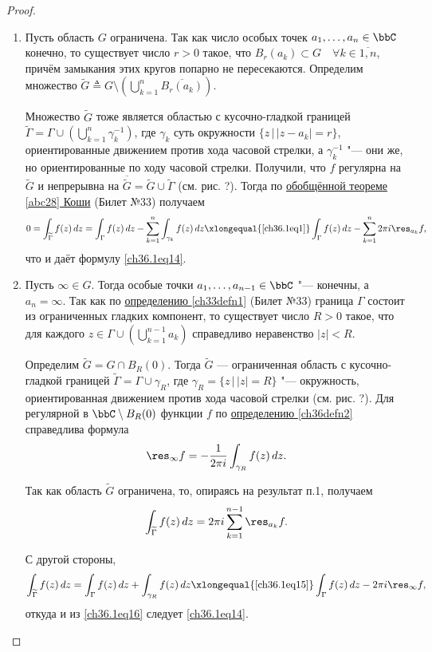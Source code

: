 \begin{proof}\leavevmode
\begin{enumerate}[wide, labelwidth=!, labelindent=0pt]
\item Пусть область $G$ ограничена. Так как число особых точек $a_1,\ldots,a_n \in \bbC$ конечно, то существует число $r > 0$ такое, что $B_r(a_k) \subset G \quad \forall k \in \overline{1,n}$, причём замыкания этих кругов попарно не пересекаются. Определим множество $\widetilde{G} \triangleq G \setminus \left( \bigcup\limits_{k = 1}^{n} \overline{B_r(a_k)}\right)$.

Множество $\widetilde{G}$ тоже является областью с кусочно-гладкой границей $\widetilde{\Gamma} = \Gamma \cup \left( \bigcup\limits_{k = 1}^{n} \gamma_{k}^{-1} \right)$,	где $\gamma_k$ суть окружности $\{ z \,\big|\, |z - a_k| = r \}$, ориентированные движением против хода часовой стрелки, а $\gamma_{k}^{-1}$ "--- они же, но ориентированные по ходу часовой стрелки. Получили, что $f$ регулярна на $\widetilde{G}$ и непрерывна на $\overline{\widetilde{G}} = \widetilde{G} \cup \widetilde{\Gamma}$ (см. рис. ?). Тогда по \hyperref[abc28]{обобщённой теореме \ref{abc28} Коши} (Билет №33) получаем
$$
0 = \int_{\widetilde{\Gamma}} f(z) \,dz = \int_{\Gamma} f(z) \,dz - \sum_{k = 1}^{n} \int_{\gamma_k} f(z) \,dz \xlongequal{\eqref{ch36.1eq1}} \int_{\Gamma} f(z) \,dz - \sum_{k = 1}^{n} 2\pi i \res_{a_k} f,
$$
что и даёт формулу \eqref{ch36.1eq14}.


\item	Пусть $\infty \in G$. Тогда особые точки $a_1,\ldots,a_{n - 1} \in \bbC$ "--- конечны, а $a_n = \infty$. Так как по \hyperref[ch33defn1]{определению \ref{ch33defn1}} (Билет №33) граница $\Gamma$ состоит из ограниченных гладких компонент, то существует число $R > 0$ такое, что для каждого $z \in \Gamma \cup \left( \bigcup\limits_{k = 1}^{n - 1} a_k \right)$ справедливо неравенство $|z| < R$.

Определим $\widetilde{G} = G \cap B_R(0)$. Тогда $\widetilde G$ — ограниченная область с кусочно-гладкой границей $\widetilde{\Gamma} = \Gamma \cup \gamma_R$, где $\gamma_R = \{ z \,\big|\, |z| = R\}$ "--- окружность, ориентированная движением против хода часовой стрелки (см. рис. ?). Для регулярной в $\bbC \setminus B_R(0)$ функции $f$ по \hyperref[ch36defn2]{определению \ref{ch36defn2}} справедлива формула
\begin{equation} \label{ch36.1eq15}
\res_{\infty} f = - \frac{1}{2\pi i} \int_{\gamma_R} f(z) \,dz.
\end{equation}

Так как область $\widetilde{G}$ ограничена, то, опираясь на результат п.1, получаем
\begin{equation} \label{ch36.1eq16}
\int_{\widetilde{\Gamma}} f(z) \,dz = 2\pi i \sum_{k = 1}^{n - 1} \res_{a_k} f.
\end{equation}
 
С другой стороны,
$$
\int_{\widetilde{\Gamma}} f(z) \,dz = \int_{\Gamma} f(z) \,dz + \int_{\gamma_R} f(z) \,dz \xlongequal{\eqref{ch36.1eq15}} \int_{\Gamma} f(z) \,dz - 2\pi i\res_{\infty} f,
$$
откуда и из \eqref{ch36.1eq16} следует \eqref{ch36.1eq14}. \qedhere
\end{enumerate}
\end{proof}

